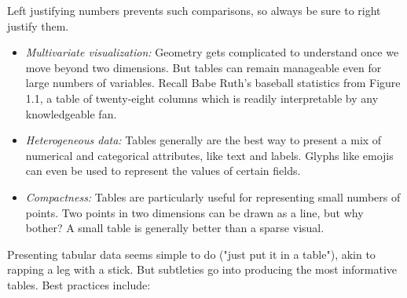 \documentclass[10pt]{article}
\begin{document}
Left justifying numbers prevents such comparisons, so always be sure to right justify them.

\begin{itemize}
  \item \emph{Multivariate visualization:} Geometry gets complicated to understand once we move beyond two dimensions. But tables can remain manageable even for large numbers of variables. Recall Babe Ruth's baseball statistics from Figure 1.1, a table of twenty-eight columns which is readily interpretable by any knowledgeable fan.
  \item \emph{Heterogeneous data:} Tables generally are the best way to present a mix of numerical and categorical attributes, like text and labels. Glyphs like emojis can even be used to represent the values of certain fields.
  \item \emph{Compactness:} Tables are particularly useful for representing small numbers of points. Two points in two dimensions can be drawn as a line, but why bother? A small table is generally better than a sparse visual.
\end{itemize}

Presenting tabular data seems simple to do ("just put it in a table"), akin to rapping a leg with a stick. But subtleties go into producing the most informative tables. Best practices include:
\end{document}

